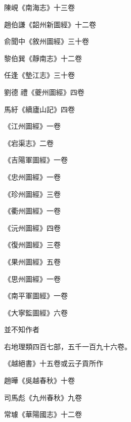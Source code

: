 \begin{pinyinscope}
 陳峴《南海志》十三卷



 趙伯謙《韶州新圖經》十二卷



 俞聞中《敘州圖經》三十卷



 黎伯巽《靜南志》十二卷



 任逢《墊江志》三十卷



 劉德
 禮《夔州圖經》四卷



 馬紆《續廬山記》四卷



 《江州圖經》一卷



 《宕渠志》二卷



 《吉陽軍圖經》一卷



 《忠州圖經》一卷



 《珍州圖經》三卷



 《衢州圖經》一卷



 《沅州圖經》四卷



 《復州圖經》三卷



 《果州圖經》五卷



 《思州圖經》一卷



 《南平軍圖經》一卷



 《大寧監圖經》六卷



 並不知作者



 右地理類四百七部，五千一百九十六卷。



 《越絕書》十五卷或云子貢所作



 趙曄《吳越春秋》十卷



 司馬彪《九州春秋》九卷



 常璩《華陽國志》十二卷




\end{pinyinscope}
